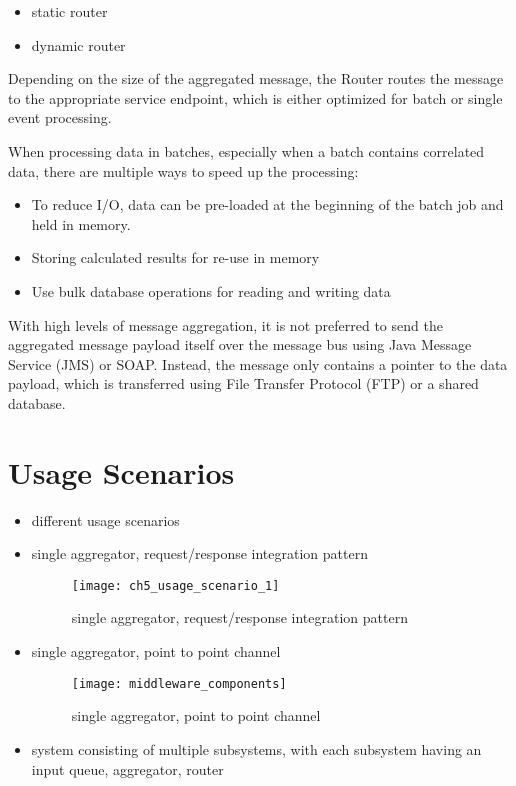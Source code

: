 \begin{itemize}
	\item{static router}
	\item{dynamic router}
\end{itemize}

Depending on the size of the aggregated message, the Router routes the message to the appropriate service endpoint, which is either optimized for batch or single event processing.

When processing data in batches, especially when a batch contains correlated data, there are multiple ways to speed up the processing:
\begin{itemize}
	\item To reduce I/O, data can be pre-loaded at the beginning of the batch job and held in memory.
	\item Storing calculated results for re-use in memory
	\item Use bulk database operations for reading and writing data
\end{itemize}

With high levels of message aggregation, it is not preferred to send the aggregated message payload itself over the message bus using Java Message Service (JMS) or SOAP. Instead, the message only contains a pointer to the data payload, which is transferred using File Transfer Protocol (FTP) or a shared database.

\section{Usage Scenarios}

\begin{itemize}
	\item different usage scenarios
	\item single aggregator, request/response integration pattern
	\begin{figure*}[htpb]
		\centering
		\texttt{[image: ch5\_usage\_scenario\_1]}
		\caption{single aggregator, request/response integration pattern}
		\label{fig:ch4_usage_scenario_1}
	\end{figure*}
	\item single aggregator, point to point channel
	\begin{figure*}[htpb]
		\centering
		\texttt{[image: middleware\_components]}
		\caption{single aggregator, point to point channel}
		\label{fig:ch5_usage_scenario_2}
	\end{figure*}
	\item system consisting of multiple subsystems, with each subsystem having an input queue, aggregator, router
	
\end{itemize}	

